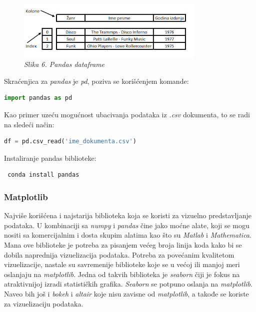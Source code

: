 \documentclass[12pt]{article}
\begin{document}
\begin{figure}[h!]
\centering
\includegraphics[width=0.8\textwidth]{pandas-dataframe.jpg}
\caption*{\textsl{Slika 6. Pandas dataframe }}
\end{figure}
Skraćenjica za \textsl{pandas} je \textsl{pd}, poziva se korišćenjem komande:
\begin{lstlisting}[language=Python]
 import pandas as pd 
\end{lstlisting}
Kao primer uzeću mogućnost ubacivanja podataka iz \textsl{.csv} dokumenta, to se radi na sledeći način:
\begin{lstlisting}[language=Python]
 df = pd.csv_read('ime_dokumenta.csv')
\end{lstlisting}
Instaliranje pandas biblioteke:
\begin{lstlisting}
 conda install pandas
\end{lstlisting}
\subsubsection{Matplotlib}
Najviše korišćena i najstarija biblioteka koja se koristi za vizuelno predstavljanje podataka. U kombinaciji sa \textsl{numpy} i \textsl{pandas} čine jako moćne alate, koji se mogu nositi sa komercijalnim i dosta skupim alatima kao što su \textsl{Matlab} i \textsl{Mathematica}. Mana ove biblioteke je potreba za pisanjem većeg broja linija koda kako bi se dobila naprednija vizuelizacija podataka. 
Potreba za povećanim kvalitetom vizuelizacije, nastale su savremenije biblioteke koje se u većoj ili manjoj meri oslanjaju na \textsl{matplotlib}. Jedna od takvih biblioteka je \textsl{seaborn} čiji je fokus na  atraktivnijoj izradi statističkih grafika.  \textsl{Seaborn} se potpuno oslanja na \textsl{matplotlib}.  Naveo bih još i \textsl{bokeh} i \textsl{altair} koje nisu zavisne od \textsl{matplotlib}, a takođe se koriste za vizuelizaciju podataka.
\end{document}
